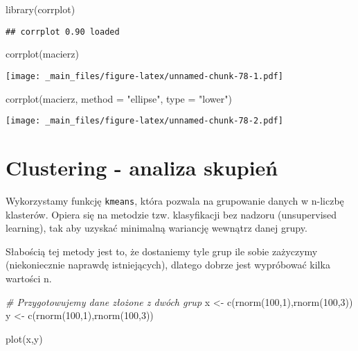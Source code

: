 \documentclass[
]{book}
\newenvironment{Shaded}{\begin{snugshade}}{\end{snugshade}}
\newcommand{\AttributeTok}[1]{\textcolor[rgb]{0.77,0.63,0.00}{#1}}
\newcommand{\CommentTok}[1]{\textcolor[rgb]{0.56,0.35,0.01}{\textit{#1}}}
\newcommand{\DecValTok}[1]{\textcolor[rgb]{0.00,0.00,0.81}{#1}}
\newcommand{\FunctionTok}[1]{\textcolor[rgb]{0.00,0.00,0.00}{#1}}
\newcommand{\NormalTok}[1]{#1}
\newcommand{\OtherTok}[1]{\textcolor[rgb]{0.56,0.35,0.01}{#1}}
\newcommand{\StringTok}[1]{\textcolor[rgb]{0.31,0.60,0.02}{#1}}
\begin{document}
\begin{Shaded}
\begin{Highlighting}[]
\FunctionTok{library}\NormalTok{(corrplot)}
\end{Highlighting}
\end{Shaded}

\begin{verbatim}
## corrplot 0.90 loaded
\end{verbatim}

\begin{Shaded}
\begin{Highlighting}[]
\FunctionTok{corrplot}\NormalTok{(macierz)}
\end{Highlighting}
\end{Shaded}

\texttt{[image: \_main\_files/figure-latex/unnamed-chunk-78-1.pdf]}

\begin{Shaded}
\begin{Highlighting}[]
\FunctionTok{corrplot}\NormalTok{(macierz, }\AttributeTok{method =} \StringTok{"ellipse"}\NormalTok{, }\AttributeTok{type =} \StringTok{"lower"}\NormalTok{)}
\end{Highlighting}
\end{Shaded}

\texttt{[image: \_main\_files/figure-latex/unnamed-chunk-78-2.pdf]}

\hypertarget{clustering---analiza-skupieux144}{%
\section{Clustering - analiza skupień}\label{clustering---analiza-skupieux144}}

Wykorzystamy funkcję \texttt{kmeans}, która pozwala na grupowanie danych w n-liczbę klasterów. Opiera się na metodzie tzw. klasyfikacji bez nadzoru (unsupervised learning), tak aby uzyskać minimalną wariancję wewnątrz danej grupy.

Słabością tej metody jest to, że dostaniemy tyle grup ile sobie zażyczymy (niekoniecznie naprawdę istniejących), dlatego dobrze jest wypróbować kilka wartości n.

\begin{Shaded}
\begin{Highlighting}[]
\CommentTok{\# Przygotowujemy dane złożone z dwóch grup}
\NormalTok{x }\OtherTok{\textless{}{-}} \FunctionTok{c}\NormalTok{(}\FunctionTok{rnorm}\NormalTok{(}\DecValTok{100}\NormalTok{,}\DecValTok{1}\NormalTok{),}\FunctionTok{rnorm}\NormalTok{(}\DecValTok{100}\NormalTok{,}\DecValTok{3}\NormalTok{))}
\NormalTok{y }\OtherTok{\textless{}{-}} \FunctionTok{c}\NormalTok{(}\FunctionTok{rnorm}\NormalTok{(}\DecValTok{100}\NormalTok{,}\DecValTok{1}\NormalTok{),}\FunctionTok{rnorm}\NormalTok{(}\DecValTok{100}\NormalTok{,}\DecValTok{3}\NormalTok{))}

\FunctionTok{plot}\NormalTok{(x,y)}
\end{Highlighting}
\end{Shaded}
\end{document}
